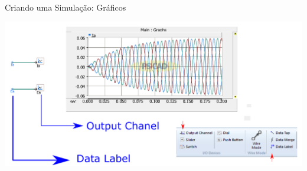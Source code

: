 \begin{frame}{Criando uma Simulação: Gráficos}
\centering


\includegraphics[width=0.85\linewidth]{./figuras/Primeiros-Passos/circuito1_grafico}



\end{frame}


